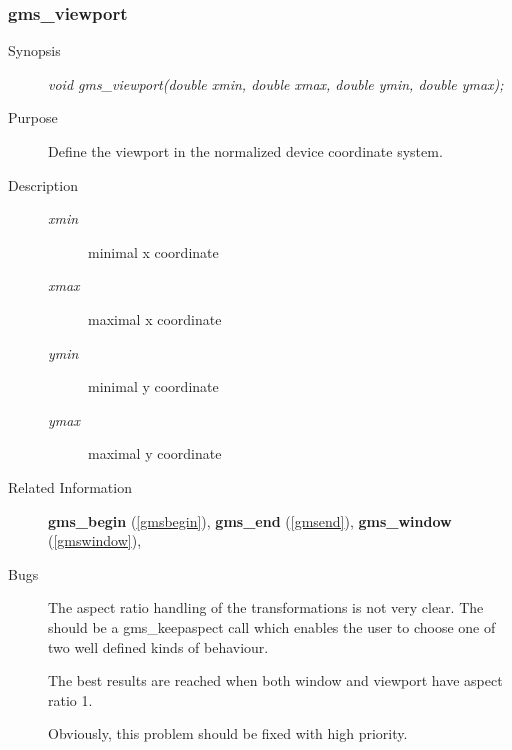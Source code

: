 \subsubsection{gms\_viewport\label{gmsviewport}}
\begin{description}
\item[Synopsis]\mbox{}


{\em void    gms\_viewport(double xmin,
double xmax,
double ymin,
double ymax);\/}
\item[Purpose]\mbox{}


Define the viewport in  the normalized device  coordinate system.
\item[Description]\mbox{}


\begin{description}
\item[{\em xmin\/}]\mbox{}

 minimal x coordinate
\item[{\em xmax\/}]\mbox{}

 maximal x coordinate
\item[{\em ymin\/}]\mbox{}

 minimal y coordinate
\item[{\em ymax\/}]\mbox{}

 maximal y coordinate
\end{description}

\item[Related Information]\mbox{}


{\bf gms\_begin} (\ref{gmsbegin}), 
{\bf gms\_end} (\ref{gmsend}), 
{\bf gms\_window} (\ref{gmswindow}), 
\item[Bugs]\mbox{}


The aspect ratio handling of the transformations is not very clear.
The should be a gms\_keepaspect call which enables the user
to choose one of two well defined kinds of behaviour.
 
The best results are reached when both window and viewport have
aspect ratio 1.

 Obviously, this problem should be fixed with high priority.

\end{description}



\newpage



